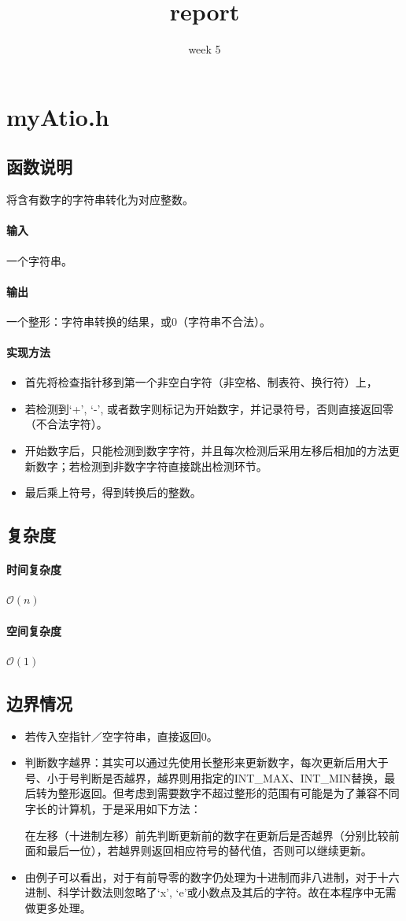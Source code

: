 \documentclass{homework}
\title{report}
\subtitle{week 5}
\begin{document}
\maketitle
\section{myAtio.h}
\subsection{函数说明}
将含有数字的字符串转化为对应整数。
\paragraph{输入}
一个字符串。
\paragraph{输出}
一个整形：字符串转换的结果，或0（字符串不合法）。
\paragraph{实现方法}
\begin{itemize}
    \item 首先将检查指针移到第一个非空白字符（非空格、制表符、换行符）上，
    \item 若检测到‘+’, ‘-’, 或者数字则标记为开始数字，并记录符号，否则直接返回零（不合法字符）。
    \item 开始数字后，只能检测到数字字符，并且每次检测后采用左移后相加的方法更新数字；若检测到非数字字符直接跳出检测环节。
    \item 最后乘上符号，得到转换后的整数。
\end{itemize}
\subsection{复杂度}
\paragraph{时间复杂度}
$\mathcal{O}(n)$
\paragraph{空间复杂度}
$\mathcal{O}(1)$
\subsection{边界情况}
\begin{itemize}
    \item 若传入空指针／空字符串，直接返回0。
    \item 判断数字越界：其实可以通过先使用长整形来更新数字，每次更新后用大于号、小于号判断是否越界，越界则用指定的INT\_MAX、INT\_MIN替换，最后转为整形返回。但考虑到需要数字不超过整形的范围有可能是为了兼容不同字长的计算机，于是采用如下方法：

          在左移（十进制左移）前先判断更新前的数字在更新后是否越界（分别比较前面和最后一位），若越界则返回相应符号的替代值，否则可以继续更新。
    \item 由例子可以看出，对于有前导零的数字仍处理为十进制而非八进制，对于十六进制、科学计数法则忽略了‘x’, ‘e’或小数点及其后的字符。故在本程序中无需做更多处理。
\end{itemize}
\end{document}
